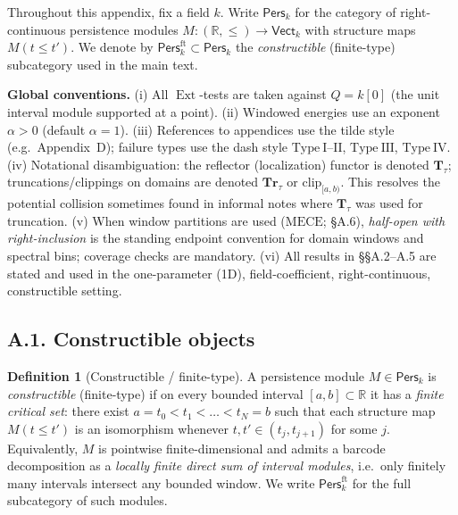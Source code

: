 \documentclass[11pt]{article}
\numberwithin{equation}{section}
\theoremstyle{plain}
\theoremstyle{definition}
\theoremstyle{remark}
\DeclareMathOperator{\Ext}{Ext}
\newcommand{\Pers}{\mathsf{Pers}}
\newcommand{\Vect}{\mathsf{Vect}}
\theoremstyle{plain}
\theoremstyle{definition}
\numberwithin{equation}{section}
\theoremstyle{definition}
\newtheorem{definition}[theorem]{Definition}
\numberwithin{equation}{section}
\theoremstyle{plain}
\theoremstyle{definition}
\theoremstyle{remark}
\newcommand{\MECE}{\mathrm{MECE}}
\newcommand{\clip}{\mathrm{clip}}
\begin{document}

\begingroup
Throughout this appendix, fix a field \(k\).
Write \(\Pers_k\) for the category of right-continuous persistence modules
\(M:(\mathbb{R},\le)\to\Vect_k\) with structure maps \(M(t\le t')\).
We denote by \(\Pers^{\mathrm{ft}}_k\subset\Pers_k\) the \emph{constructible} (finite-type) subcategory used in the main text.

\medskip
\noindent\textbf{Global conventions.}
(i) All \(\Ext\)-tests are taken against \(Q=k[0]\) (the unit interval module supported at a point).
(ii) Windowed energies use an exponent \(\alpha>0\) (default \(\alpha=1\)).
(iii) References to appendices use the tilde style (e.g.\ Appendix~D); failure types use the dash style
\(\mathrm{Type\ I\text{--}II}\), \(\mathrm{Type\ III}\), \(\mathrm{Type\ IV}\).
(iv) Notational disambiguation: the reflector (localization) functor is denoted \(\mathbf{T}_\tau\); truncations/clippings on domains are denoted \(\mathbf{Tr}_\tau\) or \(\clip_{[a,b)}\). This resolves the potential collision sometimes found in informal notes where \(\mathbf{T}_\tau\) was used for truncation.
(v) When window partitions are used (\(\MECE\); §A.6), \emph{half-open with right-inclusion} is the standing endpoint convention for domain windows and spectral bins; coverage checks are mandatory.
(vi) All results in §§A.2–A.5 are stated and used in the one-parameter (1D), field-coefficient, right-continuous, constructible setting.

\subsection*{A.1. Constructible objects}
\begin{definition}[Constructible / finite-type]\label{A:def:constructible}
A persistence module \(M\in\Pers_k\) is \emph{constructible} (finite-type) if on every bounded interval
\([a,b]\subset\mathbb{R}\) it has a \emph{finite critical set}: there exist
\(a=t_0<t_1<\dots<t_N=b\) such that each structure map
\(M(t\le t')\) is an isomorphism whenever \(t,t'\in (t_j,t_{j+1})\) for some \(j\).
Equivalently, \(M\) is pointwise finite-dimensional and admits a barcode decomposition as a
\emph{locally finite direct sum of interval modules}, i.e.\ only finitely many intervals intersect any bounded window.
We write \(\Pers^{\mathrm{ft}}_k\) for the full subcategory of such modules.
\end{definition}
\end{document}
